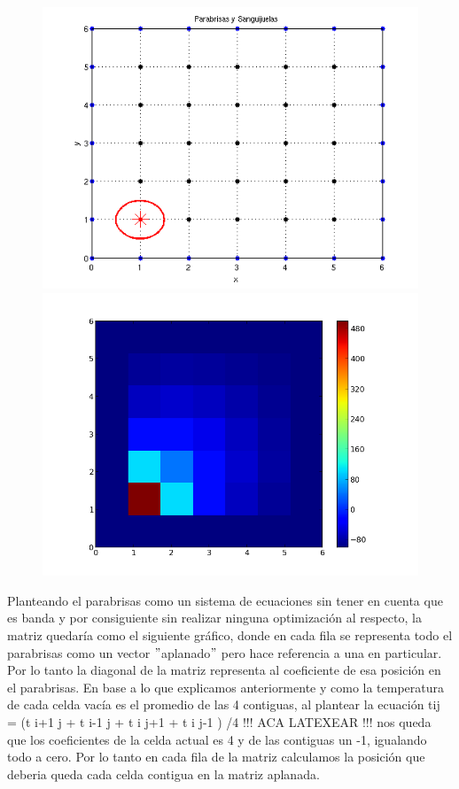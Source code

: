\begin{figure}[htb]
\begin{center}
\includegraphics[scale=0.40]{imagenes/matrizbandaej_instancia.png} 
\includegraphics[scale=0.40]{imagenes/matrizbandaej_temp.png} 
\end{center}
\end{figure}

Planteando el parabrisas como un sistema de ecuaciones sin tener en cuenta que es banda y por consiguiente sin realizar ninguna optimización al respecto, la matriz quedaría como el siguiente gráfico, donde en cada fila se representa todo el parabrisas como un vector $"$aplanado$"$ pero hace referencia a una en particular. Por lo tanto la diagonal de la matriz representa al coeficiente de esa posición en el parabrisas.
En base a lo que explicamos anteriormente y como la temperatura de cada celda vacía es el promedio de las 4 contiguas, al plantear la ecuación tij = (t i+1 j + t i-1 j + t i j+1 + t i j-1 ) /4 !!! ACA LATEXEAR !!! nos queda que los coeficientes de la celda actual es 4 y de las contiguas un -1, igualando todo a cero.
Por lo tanto en cada fila de la matriz calculamos la posición que deberia queda cada celda contigua en la matriz aplanada.

